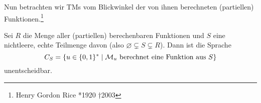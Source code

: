 % 
% 
% 
% 



Nun betrachten wir \ac{TM}s vom Blickwinkel der von ihnen berechneten
(partiellen) Funktionen.\footnote{Henry Gordon Rice *1920 †2003}

\begin{Satz}
  Sei $R$ die Menge aller (partiellen) berechenbaren Funktionen und $S$
  eine nichtleere, echte Teilmenge davon (also $\varnothing \subsetneq S \subsetneq R$).
  Dann ist die Sprache
  $$C_S=\{u\in\{0,1\}^* \mid \mathcal{M}_u \text{ berechnet eine Funktion aus }S\}$$
  unentscheidbar.
\end{Satz}


